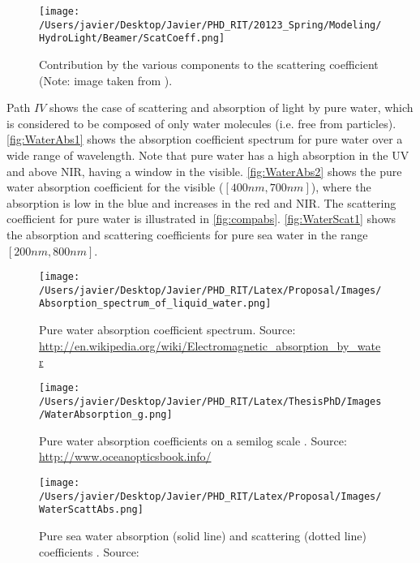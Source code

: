 \begin{figure}[htb]
\centering
      \texttt{[image: /Users/javier/Desktop/Javier/PHD\_RIT/20123\_Spring/Modeling/HydroLight/Beamer/ScatCoeff.png]}
      \caption{Contribution by the various components to the scattering coefficient (Note: image taken from \citet{Mobley:2001}).}
      \label{fig:compscat}
\end{figure}

Path $IV$ shows the case of scattering and absorption of light by pure water, which is considered to be composed of only water molecules (i.e. free from particles). \autoref{fig:WaterAbs1} shows the absorption coefficient spectrum for pure water over a wide range of wavelength. Note that pure water has a high absorption in the UV and above NIR, having a window in the visible. \autoref{fig:WaterAbs2} shows the pure water absorption coefficient for the visible ($[400nm,700nm]$), where the absorption is low in the blue and increases in the red and NIR. The scattering coefficient for pure water is illustrated in \autoref{fig:compabs}. \autoref{fig:WaterScat1} shows the absorption and scattering coefficients for pure sea water in the range $[200nm,800nm]$.

\begin{figure}[!ht]
  \centering
      \texttt{[image: /Users/javier/Desktop/Javier/PHD\_RIT/Latex/Proposal/Images/Absorption\_spectrum\_of\_liquid\_water.png]}
  \caption{Pure water absorption coefficient spectrum. Source: \protect\url{http://en.wikipedia.org/wiki/Electromagnetic_absorption_by_water}}
  \label{fig:WaterAbs1}
\end{figure}

\begin{figure}[!ht]
  \centering
      \texttt{[image: /Users/javier/Desktop/Javier/PHD\_RIT/Latex/ThesisPhD/Images/WaterAbsorption\_g.png]}
  \caption{Pure water absorption coefficients on a semilog scale \citep{Pope1997}.  Source: \protect\url{http://www.oceanopticsbook.info/}}
  \label{fig:WaterAbs2}
\end{figure}

\begin{figure}[!ht]
  \centering
      \texttt{[image: /Users/javier/Desktop/Javier/PHD\_RIT/Latex/Proposal/Images/WaterScattAbs.png]}
  \caption{Pure sea water absorption (solid line)  and scattering (dotted line) coefficients \citep{Smith1981}. Source: \citet{Mobley1994}}
  \label{fig:WaterScat1}
\end{figure}

